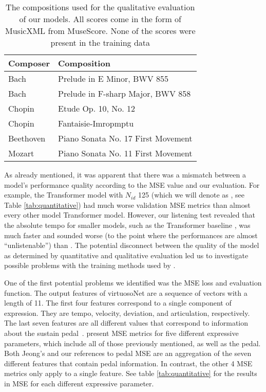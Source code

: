 \begin{table}
    \setlength{\extrarowheight}{3pt}
    \begin{center}
    \begin{tabular}[]{| l | l |}
        \hline
        Composer & Composition \\ 
        \hline 
        Bach & Prelude in E Minor, BWV 855 \\
        Bach & Prelude in F-sharp Major, BWV 858  \\ 
        Chopin & Etude Op. 10, No. 12 \\ 
        Chopin & Fantaisie-Imropmptu \\ 
        Beethoven & Piano Sonata No. 17 First Movement \\ 
        Mozart & Piano Sonata No. 11 First Movement \\ 
        \hline
    \end{tabular}
    \caption{The compositions used for the qualitative evaluation of our models. All scores come in the form of MusicXML from MuseScore. None of the scores were present in the training data}
    \label{tab:compositions}
    \end{center}
\end{table}

As already mentioned, it was apparent that there was a mismatch between a model's performance quality according to the MSE value and our evaluation. For example, the Transformer model with $N_{id}$ 125 (which we will denote as , see Table \ref{tab:quantitative}) had much worse validation MSE metrics than almost every other model Transformer model. However, our listening test revealed that the absolute tempo for smaller models, such as the Transformer baseline , was much faster and sounded worse (to the point where the performances are almost ``unlistenable'') than . The potential disconnect between the quality of the model as determined by quantitative and qualitative evaluation led us to investigate possible problems with the training methods used by \citet{jeong2019virtuosonet}. 

One of the first potential problems we identified was the MSE loss and evaluation function. The output features of virtuosoNet are a sequence of vectors with a length of 11. The first four features correspond to a single component of expression. They are tempo, velocity, deviation, and articulation, respectively. The last seven features are all different values that correspond to information about the sustain pedal~\cite{jeong2019score}. \citet{jeong2019virtuosonet} present MSE metrics for five different expressive parameters, which include all of those previously mentioned, as well as the pedal. Both Jeong's and our references to pedal MSE are an aggregation of the seven different features that contain pedal information. In contrast, the other 4 MSE metrics only apply to a single feature. See table \ref{tab:quantitative} for the results in MSE for each different expressive parameter.

